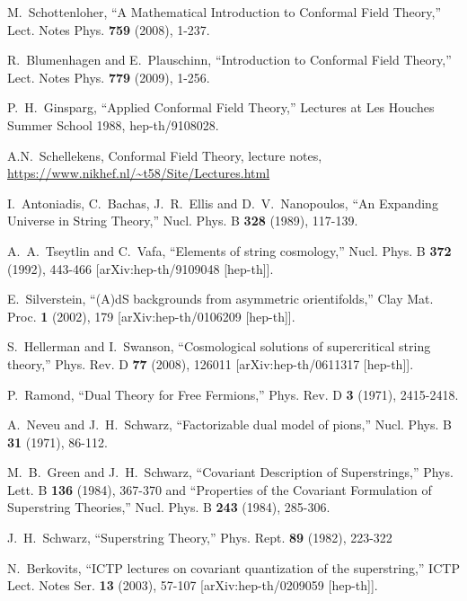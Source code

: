 \documentclass[12pt]{article}
\numberwithin{equation}{section}
\begin{document}
\begin{thebibliography}{999}
M.~Schottenloher,
``A Mathematical Introduction to Conformal Field Theory,''
Lect. Notes Phys. \textbf{759} (2008), 1-237.

R.~Blumenhagen and E.~Plauschinn,
``Introduction to Conformal Field Theory,''
Lect. Notes Phys. \textbf{779} (2009), 1-256.

  P.~H.~Ginsparg, ``Applied Conformal Field Theory,'' Lectures at Les Houches Summer School 1988, hep-th/9108028.

 A.N.~Schellekens, Conformal Field Theory, lecture notes,\\
\url{https://www.nikhef.nl/~t58/Site/Lectures.html}

I.~Antoniadis, C.~Bachas, J.~R.~Ellis and D.~V.~Nanopoulos,
``An Expanding Universe in String Theory,''
Nucl. Phys. B \textbf{328} (1989), 117-139.

A.~A.~Tseytlin and C.~Vafa,
``Elements of string cosmology,''
Nucl. Phys. B \textbf{372} (1992), 443-466
[arXiv:hep-th/9109048 [hep-th]].

E.~Silverstein,
``(A)dS backgrounds from asymmetric orientifolds,''
Clay Mat. Proc. \textbf{1} (2002), 179
[arXiv:hep-th/0106209 [hep-th]].

S.~Hellerman and I.~Swanson,
``Cosmological solutions of supercritical string theory,''
Phys. Rev. D \textbf{77} (2008), 126011
[arXiv:hep-th/0611317 [hep-th]].

P.~Ramond,
``Dual Theory for Free Fermions,''
Phys. Rev. D \textbf{3} (1971), 2415-2418.

A.~Neveu and J.~H.~Schwarz,
``Factorizable dual model of pions,''
Nucl. Phys. B \textbf{31} (1971), 86-112.

M.~B.~Green and J.~H.~Schwarz,
``Covariant Description of Superstrings,''
Phys. Lett. B \textbf{136} (1984), 367-370
and ``Properties of the Covariant Formulation of Superstring Theories,''
Nucl. Phys. B \textbf{243} (1984), 285-306.

J.~H.~Schwarz,
``Superstring Theory,''
Phys. Rept. \textbf{89} (1982), 223-322

N.~Berkovits,
``ICTP lectures on covariant quantization of the superstring,''
ICTP Lect. Notes Ser. \textbf{13} (2003), 57-107
[arXiv:hep-th/0209059 [hep-th]].


\end{thebibliography}
\end{document}
